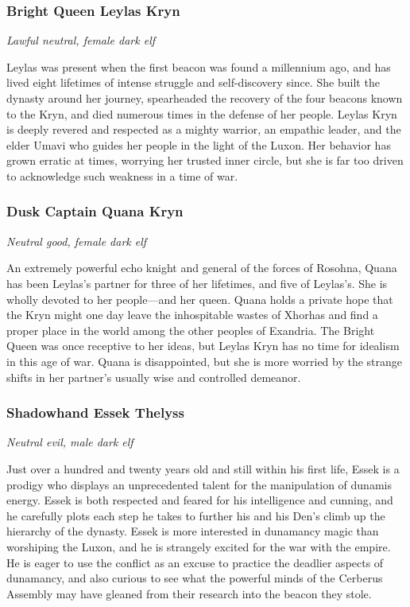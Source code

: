 \documentclass[10pt,a4paper,twoside,bg=print,twocolumn,openany,nodeprecatedcode]{dndbook}
\begin{document}
\subsubsection{Bright Queen Leylas Kryn}
\textit{Lawful neutral, female dark elf}

Leylas was present when the first beacon was found a millennium ago, and has lived eight lifetimes of intense struggle and self-discovery since. She built the dynasty around her journey, spearheaded the recovery of the four beacons known to the Kryn, and died numerous times in the defense of her people. Leylas Kryn is deeply revered and respected as a mighty warrior, an empathic leader, and the elder Umavi who guides her people in the light of the Luxon. Her behavior has grown erratic at times, worrying her trusted inner circle, but she is far too driven to acknowledge such weakness in a time of war.

\subsubsection{Dusk Captain Quana Kryn}
\textit{Neutral good, female dark elf}

An extremely powerful echo knight and general of the forces of Rosohna, Quana has been Leylas's partner for three of her lifetimes, and five of Leylas's. She is wholly devoted to her people—and her queen. Quana holds a private hope that the Kryn might one day leave the inhospitable wastes of Xhorhas and find a proper place in the world among the other peoples of Exandria. The Bright Queen was once receptive to her ideas, but Leylas Kryn has no time for idealism in this age of war. Quana is disappointed, but she is more worried by the strange shifts in her partner's usually wise and controlled demeanor.

\subsubsection{Shadowhand Essek Thelyss}
\textit{Neutral evil, male dark elf}

Just over a hundred and twenty years old and still within his first life, Essek is a prodigy who displays an unprecedented talent for the manipulation of dunamis energy. Essek is both respected and feared for his intelligence and cunning, and he carefully plots each step he takes to further his and his Den's climb up the hierarchy of the dynasty. Essek is more interested in dunamancy magic than worshiping the Luxon, and he is strangely excited for the war with the empire. He is eager to use the conflict as an excuse to practice the deadlier aspects of dunamancy, and also curious to see what the powerful minds of the Cerberus Assembly may have gleaned from their research into the beacon they stole.
\end{document}
